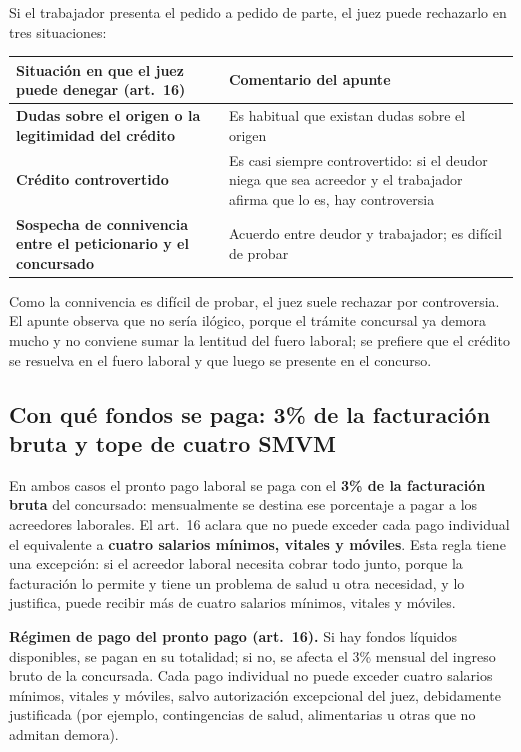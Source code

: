 \documentclass[12pt,oneside]{book}
\begin{document}
Si el trabajador presenta el pedido a pedido de parte, el juez puede rechazarlo en tres situaciones:

\begingroup
\small
\renewcommand{\arraystretch}{1.25}
\begin{tabularx}{\textwidth}{>{\raggedright\arraybackslash}p{} Y}
\toprule
\textbf{Situación en que el juez puede denegar (art.~16)} & \textbf{Comentario del apunte} \\
\midrule
\textbf{Dudas sobre el origen o la legitimidad del crédito} & Es habitual que existan dudas sobre el origen \\
\textbf{Crédito controvertido} & Es casi siempre controvertido: si el deudor niega que sea acreedor y el trabajador afirma que lo es, hay controversia \\
\textbf{Sospecha de connivencia entre el peticionario y el concursado} & Acuerdo entre deudor y trabajador; es difícil de probar \\
\bottomrule
\end{tabularx}
\endgroup

\medskip
Como la connivencia es difícil de probar, el juez suele rechazar por controversia. El apunte observa que no sería ilógico, porque el trámite concursal ya demora mucho y no conviene sumar la lentitud del fuero laboral; se prefiere que el crédito se resuelva en el fuero laboral y que luego se presente en el concurso.

\subsection{Con qué fondos se paga: 3\% de la facturación bruta y tope de cuatro SMVM}

En ambos casos el pronto pago laboral se paga con el \textbf{3\% de la facturación bruta} del concursado: mensualmente se destina ese porcentaje a pagar a los acreedores laborales. El art.~16 aclara que no puede exceder cada pago individual el equivalente a \textbf{cuatro salarios mínimos, vitales y móviles}. Esta regla tiene una excepción: si el acreedor laboral necesita cobrar todo junto, porque la facturación lo permite y tiene un problema de salud u otra necesidad, y lo justifica, puede recibir más de cuatro salarios mínimos, vitales y móviles.

\begin{important}
\textbf{Régimen de pago del pronto pago (art.~16).} Si hay fondos líquidos disponibles, se pagan en su totalidad; si no, se afecta el 3\% mensual del ingreso bruto de la concursada. Cada pago individual no puede exceder cuatro salarios mínimos, vitales y móviles, salvo autorización excepcional del juez, debidamente justificada (por ejemplo, contingencias de salud, alimentarias u otras que no admitan demora).
\end{important}
\end{document}
